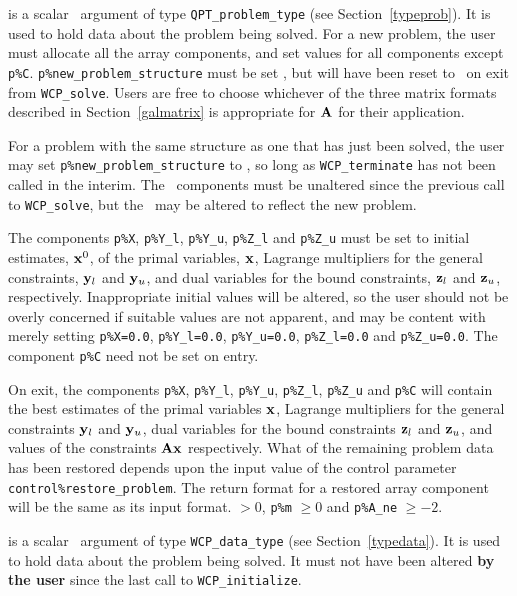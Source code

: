 \documentclass{galahad}
\newcommand{\packagename}{WCP}
\begin{document}
\vspace*{-3mm}
\begin{description}
 is a scalar \intentinout\ argument of type 
{\tt QPT\_problem\_type}
(see Section~\ref{typeprob}). 
It is used to hold data about the problem being solved.
For a new problem, the user must allocate all the array components,
and set values for all components except {\tt p\%C}.
{\tt p\%new\_problem\_structure} must be set \true, but will have been reset
to \false\ on exit from {\tt \packagename\_solve}.
Users are free to choose whichever
of the three matrix formats described in Section~\ref{galmatrix} 
is appropriate for ${\mathbf{A}}$ for their application.

For a problem with the same structure as one that has just been 
solved, the user may set {\tt p\%new\_problem\_str\-u\-cture} to \false,
so long as {\tt \packagename\_terminate} has not been called in the interim.
The \integer\ components must be unaltered since the
previous call to {\tt \packagename\_solve}, but the \realdp\ 
may be altered to reflect the new problem.

The components {\tt p\%X}, {\tt p\%Y\_l}, {\tt p\%Y\_u}, {\tt p\%Z\_l} 
and {\tt p\%Z\_u}
must be set to initial estimates, ${\mathbf{x}}^{0}$, of the primal variables, 
${\mathbf{x}}$, Lagrange multipliers for the general constraints, ${\mathbf{y}}_l$ and ${\mathbf{y}}_u$, 
and dual variables for the bound constraints, ${\mathbf{z}}_l$ and ${\mathbf{z}}_u$, 
respectively.
Inappropriate initial values will be altered, so the user should
not be overly concerned if suitable values are not apparent, and may be
content with merely setting {\tt p\%X=0.0},
{\tt p\%Y\_l=0.0}, {\tt p\%Y\_u=0.0}, {\tt p\%Z\_l=0.0} 
and 
{\tt p\%Z\_u=0.0}.
The component {\tt p\%C} need not be set on entry.

On exit, the components {\tt p\%X},
{\tt p\%Y\_l}, {\tt p\%Y\_u}, {\tt p\%Z\_l}, {\tt p\%Z\_u} and {\tt p\%C}
will contain the best estimates of the primal variables ${\mathbf{x}}$, 
Lagrange multipliers for the general
constraints ${\mathbf{y}}_l$ and ${\mathbf{y}}_u$, 
dual variables for the bound constraints ${\mathbf{z}}_l$ and ${\mathbf{z}}_u$, 
and values of the constraints ${\mathbf{A}} {\mathbf{x}}$ respectively.
What of the remaining problem data has been restored depends upon
the input value of the control parameter {\tt control\%restore\_problem}.
The return format for a restored array component will be the same as its
input format.
 $> 0$, {\tt p\%m} $\geq 0$ and {\tt p\%A\_ne} 
              $\geq -2$.

 is a scalar \intentinout\ argument of type 
{\tt \packagename\_data\_type}
(see Section~\ref{typedata}). It is used to hold data about the problem being 
solved. It must not have been altered {\bf by the user} since the last call to 
{\tt \packagename\_initialize}.


\end{description}
\end{document}
